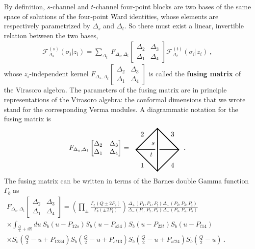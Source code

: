 \documentclass[12pt, a4paper, notitlepage, twoside]{report}
\numberwithin{equation}{section}
\theoremstyle{break}
\begin{document}
By definition, $s$-channel and $t$-channel four-point blocks are two bases of the same space of solutions of the four-point Ward identities, whose elements are respectively parametrized by $\Delta_s$ and $\Delta_t$.
So there must exist a linear, invertible relation between the two bases, 
\begin{align}
 \mathcal{F}^{(s)}_{\Delta_s}(\sigma_i|z_i) = \sum_{\Delta_t}\ F_{\Delta_s,\Delta_t}\begin{bmatrix} \Delta_2 & \Delta_3 \\ \Delta_1 & \Delta_4 \end{bmatrix} \mathcal{F}^{(t)}_{\Delta_t}(\sigma_i|z_i)\ ,
 \label{eq:fusrel}
\end{align}
whose $z_i$-independent kernel $F_{\Delta_s,\Delta_t}\begin{bmatrix} \Delta_2 & \Delta_3 \\ \Delta_1 & \Delta_4 \end{bmatrix}$ is called the \textbf{\boldmath fusing matrix} of the Virasoro algebra.
The parameters of the fusing matrix are in principle representations of the Virasoro algebra: the conformal dimensions that we wrote stand for the corresponding Verma modules.
A diagrammatic notation for the fusing matrix is 
\begin{align}
 F_{\Delta_s,\Delta_t}\begin{bmatrix} \Delta_2 & \Delta_3 \\ \Delta_1 & \Delta_4 \end{bmatrix} = \ \ 
\begin{tikzpicture}[baseline=(current  bounding  box.center), very thick, scale = .55]
\draw (0, -2) -- node [below left] {$1$} (-2, 0) -- node [above left] {$2$} (0, 2) -- node [above right] {$3$} (2, 0) -- node [below right] {$4$} (0, -2) -- (0, 2);
\draw (-2, 0) -- (-.2, 0) node [below left] {$t$}; \draw (.2, 0) -- (2, 0);
\node [above left] at (0, .2) {$s$};
\end{tikzpicture}
\ \ .
\end{align}
The fusing matrix can be written in terms of the Barnes double Gamma function $\Gamma_b$ as \cite{tv12} 
\begin{multline}
 F_{\Delta_s,\Delta_t}\begin{bmatrix} \Delta_2 & \Delta_3 \\ \Delta_1 & \Delta_4 \end{bmatrix} = \left(\prod_{\pm}\frac{\Gamma_b(Q\pm 2P_s)}{\Gamma_b(\pm 2P_t)}\right) \frac{\Delta_+(P_1,P_4,P_t)\Delta_+(P_2,P_3,P_t)}{\Delta_-(P_1,P_2,P_s)\Delta_-(P_3,P_4,P_s)}
 \\
 \times \int_{\frac{Q}{4}+i\mathbb{R}}du \ S_b(u-P_{12s})S_b(u-P_{s34})S_b(u-P_{23t})S_b(u-P_{t14}) \hspace{3cm}
 \\
 \times S_b(\tfrac{Q}{2}-u+P_{1234}) S_b(\tfrac{Q}{2}-u+P_{st13}) S_b(\tfrac{Q}{2}-u+P_{st24})S_b(\tfrac{Q}{2}-u) \ .
\end{multline}
\end{document}

